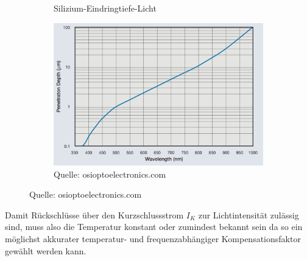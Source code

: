 \begin{figure}[H]
\begin{subfigure}[b]{0.6\textwidth}
    \caption{Silizium-Eindringtiefe-Licht}
    \includegraphics[width=\textwidth]{img/Silizium-Eindringtiefe-Licht.png}
    \caption*{Quelle: osioptoelectronics.com}
  \label{fig:Silizium-eindingtiefe}
  \end{subfigure}
\end{figure}







\noindent Damit Rückschlüsse über den Kurzschlussstrom $I_K$ zur Lichtintensität zulässig sind, muss also die Temperatur konstant oder zumindest bekannt sein da so ein möglichst akkurater temperatur- und frequenzabhängiger Kompensationsfaktor gewählt werden kann.
